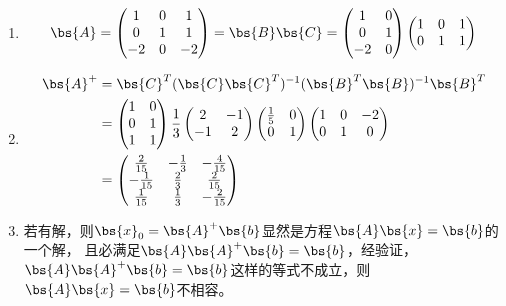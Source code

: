 \subsection{}
\begin{enumerate}
\item 
\begin{align*}
\bs{A}=\begin{pmatrix}
    1& 0 &1 \\
    0& 1 & 1\\
    -2 & 0& -2
\end{pmatrix}=\bs{B}\bs{C}=\begin{pmatrix}
    1& 0  \\
    0& 1 \\
    -2 & 0
\end{pmatrix}\begin{pmatrix}
    1& 0  &1\\
    0& 1 &1\\
\end{pmatrix}
\end{align*}

\item  
\begin{align*}
    \bs{A}^+&=\bs{C}^T(\bs{C}\bs{C}^T)^{-1}(\bs{B}^T\bs{B})^{-1}\bs{B}^T \\
    &=\begin{pmatrix}
        1& 0  \\
        0& 1 \\
        1 & 1
    \end{pmatrix}
    \frac{1}{3}
    \begin{pmatrix}
        2& -1  \\
        -1& 2 \\
    \end{pmatrix}
    \begin{pmatrix}
        \frac{1}{5}& 0  \\
        0& 1 \\
    \end{pmatrix}
    \begin{pmatrix}
        1& 0 &-2 \\
        0& 1 & 0\\
    \end{pmatrix}\\
    &=\begin{pmatrix}
        \frac{2}{15}& -\frac{1}{3} &-\frac{4}{15} \\
        -\frac{1}{15}& \frac{2}{3} & \frac{2}{15}\\
        \frac{1}{15} & \frac{1}{3}& -\frac{2}{15}
    \end{pmatrix}
\end{align*}
\item  若有解，则$\bs{x}_0=\bs{A}^+\bs{b}$显然是方程$\bs{A}\bs{x}=\bs{b}$的一个解，
且必满足$\bs{A}\bs{A}^+\bs{b}=\bs{b}$，经验证，
$\bs{A}\bs{A}^+\bs{b}=\bs{b}$这样的等式不成立，则$\bs{A}\bs{x}=\bs{b}$不相容。


\end{enumerate}
